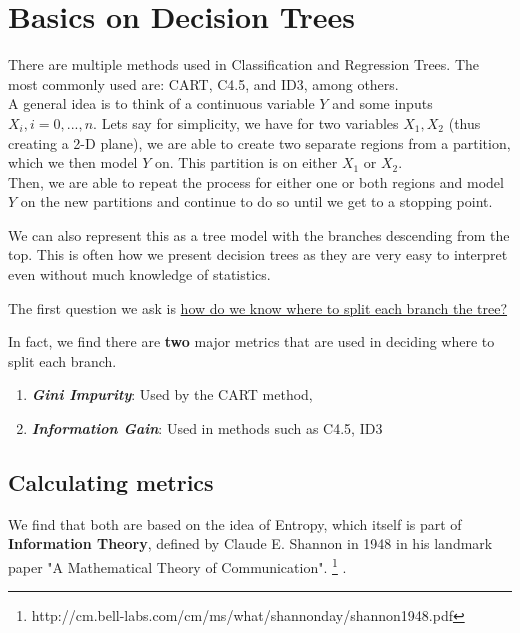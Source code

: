 \documentclass[11pt,a4paper]{report}
\begin{document}
\section{Basics on Decision Trees}
There are multiple methods used in Classification and Regression Trees. The most commonly used are: CART, C4.5, and ID3, among others. \\
A general idea is to think of a continuous variable $Y$ and some inputs $X_i ,  i = 0,...,n$. Lets say for simplicity, we have for two variables $X_1, X_2$ (thus creating a 2-D plane), we are able to create two separate regions from a partition, which we then model $Y$ on. This partition is on either $X_1$ or $X_2$. \\
Then, we are able to repeat the process for either one or both regions and model $Y$ on the new partitions and continue to do so until we get to a stopping point.

We can also represent this as a tree model with the branches descending from the top. This is often how we present decision trees as they are very easy to interpret even without much knowledge of statistics.



The first question we ask is \underline{how do we know where to split each branch the tree?}
\bigskip

In fact, we find there are \textbf{two} major metrics that are used in deciding where to split each branch.

\begin{enumerate}
    \item \textbf{\textit{Gini Impurity}}: Used by the CART method, 
    
    \item \textbf{\textit{Information Gain}}: Used in methods such as C4.5, ID3
\end{enumerate}

\subsection{Calculating metrics}
We find that both are based on the idea of Entropy, which itself is part of \textbf{Information Theory}, defined by Claude E. Shannon in 1948 in his landmark paper "A Mathematical Theory of Communication". \footnote{http://cm.bell-labs.com/cm/ms/what/shannonday/shannon1948.pdf} \cite{Shannon}.
\end{document}
